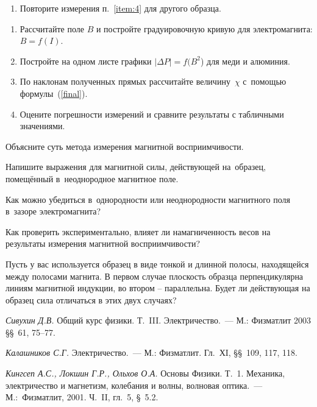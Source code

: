 \begin{lab:task}
\begin{enumerate}
\item Повторите измерения п.~\ref{item:4} для другого образца.

\end{enumerate}


\begin{enumerate}
	\item Рассчитайте поле $B$ и постройте градуировочную кривую для электромагнита: $B=f(I)$.
	\item Постройте на одном листе графики $|\Delta P|=f(B^2$) для меди и алюминия.
	\item По наклонам полученных прямых рассчитайте величину~$\chi$ с~помощью формулы~(\eqref{final}).
	\item Оцените погрешности измерений и сравните результаты с табличными значениями.
\end{enumerate}

\end{lab:task}


\begin{lab:questions}
	\item Объясните суть метода измерения магнитной восприимчивости.
	\item Напишите выражения для магнитной силы, действующей на~образец, помещённый в~неоднородное магнитное поле.
	\item Как можно убедиться в~однородности или неоднородности магнитного поля в~зазоре электромагнита?
	\item Как проверить экспериментально, влияет ли намагниченность весов на результаты измерения магнитной восприимчивости?
	\item Пусть у вас используется образец в виде тонкой и длинной полосы, находящейся между полосами магнита. В первом случае плоскость образца перпендикулярна линиям магнитной индукции, во втором – параллельна. Будет ли действующая на образец сила отличаться в этих двух случаях?
\end{lab:questions}


\begin{lab:literature}
	\item \emph{Сивухин Д.В.} Общий курс физики. Т.~III. Электричество.~--- М.: Физматлит 2003 \S\S~61, 75--77.
	\item \emph {Калашников С.Г.} Электричество.~--- М.: Физматлит. Гл.~ХI, \S\S~109, 117, 118.
	\item \emph{Кингсеп А.С., Локшин Г.Р., Ольхов О.А.} Основы Физики. Т.~1. Механика, электричество и магнетизм, колебания и волны, волновая оптика.~--- М.:~Физматлит, 2001. Ч.~II, гл.~5, \S~5.2.
\end{lab:literature}

